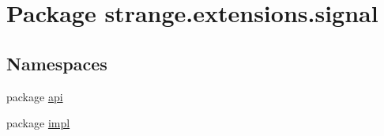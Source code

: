 \hypertarget{namespacestrange_1_1extensions_1_1signal}{\section{Package strange.\-extensions.\-signal}
\label{namespacestrange_1_1extensions_1_1signal}
}
\subsection*{Namespaces}
\begin{DoxyCompactItemize}
\item 
package \hyperlink{namespacestrange_1_1extensions_1_1signal_1_1api}{api}
\item 
package \hyperlink{namespacestrange_1_1extensions_1_1signal_1_1impl}{impl}
\end{DoxyCompactItemize}
